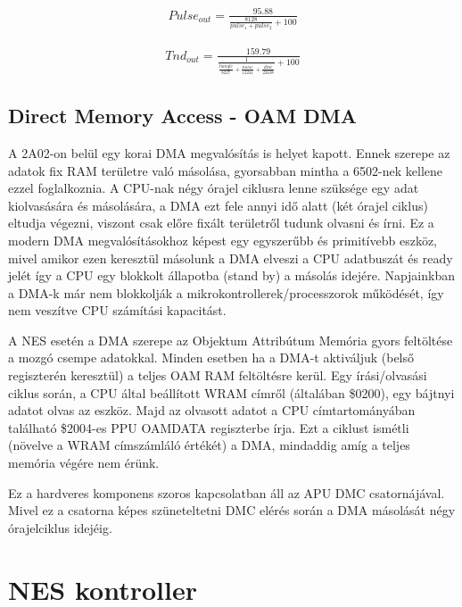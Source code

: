 	\begin{align}
		\label{mat:APU-nonlin-2}
		Pulse_{out} = \frac{95.88}{\frac{8128}{pulse_1 + pulse_2} + 100}
	\end{align}
	
	\begin{align}
		\label{mat:APU-nonlin-3}
		Tnd_{out} = \frac{159.79}{\frac{1}{\frac{tiangle}{8227} + \frac{noise}{12241} + \frac{dmc}{22638}} + 100}
	\end{align}

	\subsection{Direct Memory Access - OAM DMA}
	\label{sec:DMA}
	
	A 2A02-on belül egy korai DMA megvalósítás is helyet kapott. Ennek szerepe az adatok fix RAM területre való másolása, gyorsabban mintha a 6502-nek kellene ezzel foglalkoznia. A CPU-nak négy órajel ciklusra lenne szüksége egy adat kiolvasására és másolására, a DMA ezt fele annyi idő alatt (két órajel ciklus) eltudja végezni, viszont csak előre fixált területről tudunk olvasni és írni. Ez a modern DMA megvalósításokhoz képest egy egyszerűbb és primitívebb eszköz, mivel amikor ezen keresztül másolunk a DMA elveszi a CPU adatbuszát és ready jelét így a CPU egy blokkolt állapotba (stand by) a másolás idejére. Napjainkban a DMA-k már nem blokkolják a mikrokontrollerek/processzorok működését, így nem veszítve CPU számítási kapacitást.
	
	A NES esetén a DMA szerepe az Objektum Attribútum Memória gyors feltöltése a mozgó csempe adatokkal. Minden esetben ha a DMA-t aktiváljuk (belső regiszterén keresztül) a teljes OAM RAM feltöltésre kerül. Egy írási/olvasási ciklus során, a CPU által beállított WRAM címről (általában \$0200), egy bájtnyi adatot olvas az eszköz. Majd az olvasott adatot a CPU címtartományában található \$2004-es PPU OAMDATA regiszterbe írja. Ezt a ciklust ismétli (növelve a WRAM címszámláló értékét) a DMA, mindaddig amíg a teljes memória végére nem érünk.
	
	Ez a hardveres komponens szoros kapcsolatban áll az APU DMC csatornájával. Mivel ez a csatorna képes szüneteltetni DMC elérés során a DMA másolását négy órajelciklus idejéig.  
	
\section{NES kontroller}
\label{sec:NES-controller}


